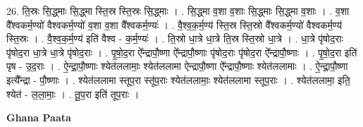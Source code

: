 \documentclass[17pt]{extarticle}
\begin{document}
26. ति॒स्रः सि॒द्ध्माः सि॒द्ध्मा स्ति॒स्र स्ति॒स्रः सि॒द्ध्माः । . सि॒द्ध्मा व॒शा व॒शाः सि॒द्ध्माः सि॒द्ध्मा व॒शाः । . व॒शा वै᳚श्वकर्म॒ण्यो॑ वैश्वकर्म॒ण्यो॑ व॒शा व॒शा वै᳚श्वकर्म॒ण्यः॑ । . वै॒श्व॒क॒र्म॒ण्य॑ स्ति॒स्र स्ति॒स्रो वै᳚श्वकर्म॒ण्यो॑ वैश्वकर्म॒ण्य॑ स्ति॒स्रः । . वै॒श्व॒क॒र्म॒ण्य॑ इति॑ वैश्व - क॒र्म॒ण्यः॑ । . ति॒स्रो धा॒त्रे धा॒त्रे ति॒स्र स्ति॒स्रो धा॒त्रे । . धा॒त्रे पृ॑षोद॒राः पृ॑षोद॒रा धा॒त्रे धा॒त्रे पृ॑षोद॒राः । . पृ॒षो॒द॒रा ऐ᳚न्द्रापौ॒ष्णा ऐ᳚न्द्रापौ॒ष्णाः पृ॑षोद॒राः पृ॑षोद॒रा ऐ᳚न्द्रापौ॒ष्णाः । . पृ॒षो॒द॒रा इति॑ पृष - उ॒द॒राः । . ऐ॒न्द्रा॒पौ॒ष्णाः श्येत॑ललामाः॒ श्येत॑ललामा ऐन्द्रापौ॒ष्णा ऐ᳚न्द्रापौ॒ष्णाः श्येत॑ललामाः । . ऐ॒न्द्रा॒पौ॒ष्णा इत्यै᳚न्द्रा - पौ॒ष्णाः । . श्येत॑ललामा स्तूप॒रा स्तू॑प॒राः श्येत॑ललामाः॒ श्येत॑ललामा स्तूप॒राः । . श्येत॑ललामा॒ इति॒ श्येत॑ - ल॒ला॒माः॒ । . तू॒प॒रा इति॑ तूप॒राः । \newline

\textbf{Ghana Paata } \newline
\end{document}
